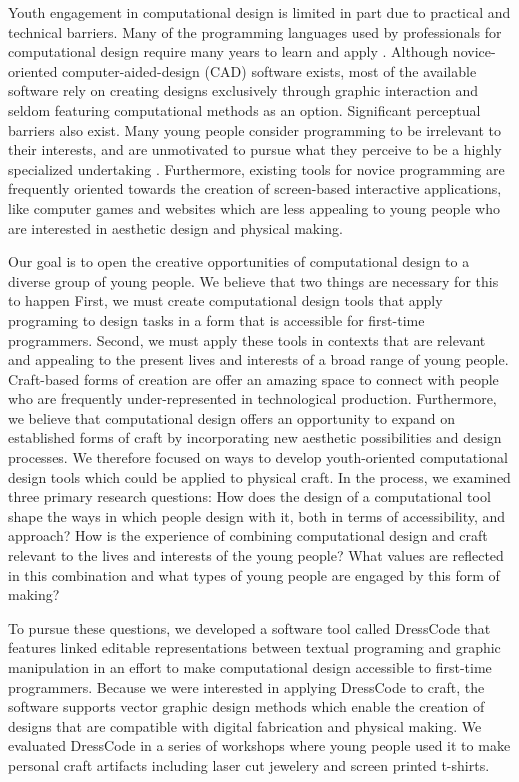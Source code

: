 \documentclass{sigchi}
\begin{document}
Youth engagement in computational design is limited in part due to practical and technical barriers. Many of the programming languages used by professionals for computational design require many years to learn and apply \cite{reas}. Although novice-oriented computer-aided-design (CAD) software exists, most of the available software rely on creating designs exclusively through graphic interaction and seldom featuring computational methods as an option. Significant perceptual barriers also exist. Many young people consider programming to be irrelevant to their interests, and are unmotivated to pursue what they perceive to be a highly specialized undertaking \cite{resnick1}. Furthermore, existing tools for novice programming are frequently oriented towards the creation of screen-based interactive applications, like computer games and websites which are less appealing to young people who are interested in aesthetic design and physical making. 

Our goal is to open the creative opportunities of computational design to a diverse group of young people. We believe that two things are necessary for this to happen First, we must create computational design tools that apply programing to design tasks in a form that is accessible for first-time programmers. Second, we must apply these tools in contexts that are relevant and appealing to the present lives and interests of a broad range of young people. Craft-based forms of creation are offer an amazing space to connect with people who are frequently under-represented in technological production. Furthermore, we believe that computational design offers an opportunity to expand on established forms of craft by incorporating new aesthetic possibilities and design processes. We therefore focused on ways to develop youth-oriented computational design tools which could be applied to physical craft.  In the process, we examined three primary research questions: How does the design of a computational tool shape the ways in which people design with it, both in terms of accessibility, and approach? How is the experience of combining computational design and craft relevant to the lives and interests of the young people? What values are reflected in this combination and what types of young people are engaged by this form of making?
 
To pursue these questions, we developed a software tool called DressCode that features linked editable representations between textual programing and graphic manipulation in an effort to make computational design accessible to first-time programmers. Because we were interested in applying DressCode to craft, the software supports vector graphic design methods which enable the creation of designs that are compatible with digital fabrication and physical making. We evaluated DressCode in a series of workshops where young people used it to make personal craft artifacts including laser cut jewelery and screen printed t-shirts. 
\end{document}
